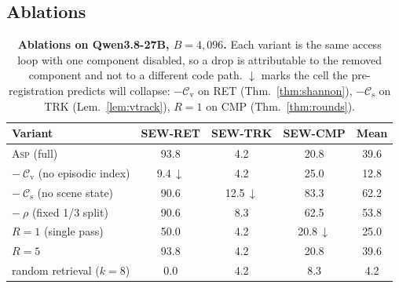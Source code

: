 \documentclass[10pt]{article}
\theoremstyle{definition}
\theoremstyle{plain}
\newcommand{\ASP}{\textsc{Asp}}
\newcommand{\cs}{\mathcal{C}_{\mathrm{s}}}
\newcommand{\cv}{\mathcal{C}_{\mathrm{v}}}
\begin{document}
\subsection{Ablations}


\begin{table}[!t]
\centering\small
\caption{\textbf{Ablations on Qwen3.8-27B, $B{=}4{,}096$.} Each variant is the same access loop with one component disabled, so a drop is attributable to the removed component and not to a different code path. $\downarrow$ marks the cell the pre-registration predicts will collapse: $-\cv$ on RET (Thm.~\ref{thm:shannon}), $-\cs$ on TRK (Lem.~\ref{lem:vtrack}), $R{=}1$ on CMP (Thm.~\ref{thm:rounds}).}
\label{tab:ablation}
\begin{tabular}{lcccc}
\toprule
Variant & SEW-RET & SEW-TRK & SEW-CMP & Mean \\
\midrule
\ASP{} (full) & 93.8 & 4.2 & 20.8 & 39.6 \\
$-\ \cv$ (no episodic index) & 9.4\,$\downarrow$ & 4.2 & 25.0 & 12.8 \\
$-\ \cs$ (no scene state) & 90.6 & 12.5\,$\downarrow$ & 83.3 & 62.2 \\
$-\ \rho$ (fixed 1/3 split) & 90.6 & 8.3 & 62.5 & 53.8 \\
$R{=}1$ (single pass) & 50.0 & 4.2 & 20.8\,$\downarrow$ & 25.0 \\
$R{=}5$ & 93.8 & 4.2 & 20.8 & 39.6 \\
random retrieval ($k{=}8$) & 0.0 & 4.2 & 8.3 & 4.2 \\
\bottomrule
\end{tabular}
\end{table}
\end{document}
